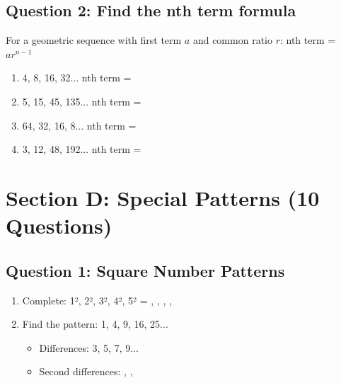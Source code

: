 \documentclass{article}
\begin{document}
\subsection*{Question 2: Find the nth term formula}

For a geometric sequence with first term $a$ and common ratio $r$:
nth term = $ar^{n-1}$

\begin{enumerate}
    \item 4, 8, 16, 32... nth term = \underline{\hspace{4cm}}
    \item 5, 15, 45, 135... nth term = \underline{\hspace{4cm}}
    \item 64, 32, 16, 8... nth term = \underline{\hspace{4cm}}
    \item 3, 12, 48, 192... nth term = \underline{\hspace{4cm}}
\end{enumerate}

\section{Section D: Special Patterns (10 Questions)}

\subsection*{Question 1: Square Number Patterns}

\begin{enumerate}
    \item Complete: 1², 2², 3², 4², 5² = \underline{\hspace{1cm}}, \underline{\hspace{1cm}}, \underline{\hspace{1cm}}, \underline{\hspace{1cm}}, \underline{\hspace{1cm}}
    \item Find the pattern: 1, 4, 9, 16, 25...
          \begin{itemize}
              \item Differences: 3, 5, 7, 9...
              \item Second differences: \underline{\hspace{1cm}}, \underline{\hspace{1cm}}, \underline{\hspace{1cm}}
          \end{itemize}
\end{enumerate}
\end{document}
